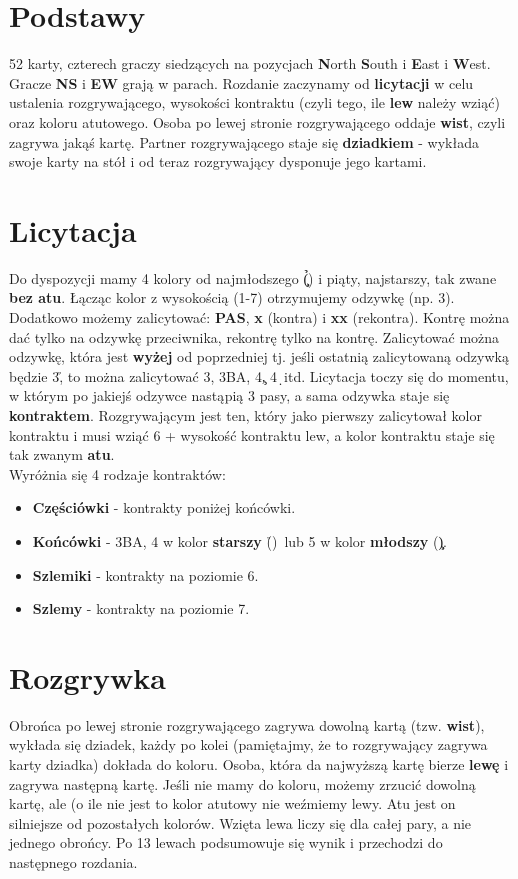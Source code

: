 \documentclass{article}
\begin{document}
\section{Podstawy}
52 karty, czterech graczy siedzących na pozycjach \textbf{N}orth \textbf{S}outh i \textbf{E}ast i \textbf{W}est.
Gracze \textbf{NS} i \textbf{EW} grają w parach. Rozdanie zaczynamy od \textbf{licytacji} w celu ustalenia
rozgrywającego, wysokości kontraktu (czyli tego, ile \textbf{lew} należy wziąć) oraz koloru atutowego. Osoba po lewej
stronie rozgrywającego oddaje \textbf{wist}, czyli zagrywa jakąś kartę. Partner rozgrywającego staje się 
\textbf{dziadkiem} - wykłada swoje karty na stół i od teraz rozgrywający dysponuje jego kartami.
\section{Licytacja}
Do dyspozycji mamy 4 kolory od najmłodszego (\c\d\h\s) i piąty, najstarszy, tak zwane \textbf{bez atu}. Łącząc kolor z wysokością (1-7)
otrzymujemy odzywkę (np. 3\s). Dodatkowo możemy zalicytować: \textbf{PAS}, \textbf{x} (kontra) i \textbf{xx} (rekontra).
Kontrę można dać tylko na odzywkę przeciwnika, rekontrę tylko na kontrę. Zalicytować można odzywkę, która jest
\textbf{wyżej} od poprzedniej tj. jeśli ostatnią zalicytowaną odzywką będzie 3\h, to można zalicytować 3\s, 3BA, 4\c,
4\d\ itd. Licytacja toczy się do momentu, w którym po jakiejś odzywce nastąpią 3 pasy, a sama odzywka staje się
\textbf{kontraktem}. Rozgrywającym jest ten, który jako pierwszy zalicytował kolor kontraktu i musi wziąć 6 + wysokość
kontraktu lew, a kolor kontraktu staje się tak zwanym \textbf{atu}.\\
Wyróżnia się 4 rodzaje kontraktów:
\begin{itemize}
	\item \textbf{Częściówki} - kontrakty poniżej końcówki.
	\item \textbf{Końcówki} - 3BA, 4 w kolor \textbf{starszy} (\h\s)\ lub 5 w kolor \textbf{młodszy} (\c\d).
	\item \textbf{Szlemiki} - kontrakty na poziomie 6. 
	\item \textbf{Szlemy} - kontrakty na poziomie 7. 
\end{itemize}
\section{Rozgrywka}
Obrońca po lewej stronie rozgrywającego zagrywa dowolną kartą (tzw. \textbf{wist}), wykłada się dziadek, każdy po kolei
(pamiętajmy, że to rozgrywający zagrywa karty dziadka) dokłada do koloru. Osoba,
która da najwyższą kartę bierze \textbf{lewę} i zagrywa następną kartę. Jeśli nie mamy do koloru, możemy zrzucić
dowolną kartę, ale (o ile nie jest to kolor atutowy nie weźmiemy lewy. Atu jest on silniejsze od pozostałych kolorów. Wzięta lewa
liczy się dla całej pary, a nie jednego obrońcy. Po 13 lewach podsumowuje się wynik i przechodzi do następnego rozdania.
\end{document}

